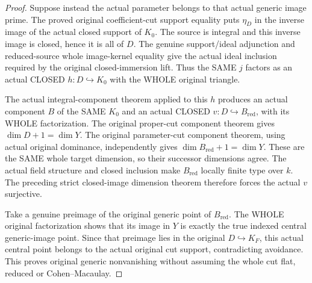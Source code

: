 \begin{proof}
Suppose instead the actual parameter belongs to that actual generic
image prime. The proved original coefficient-cut support equality puts
$\eta_D$ in the inverse image of the actual closed support of $K_0$.
The source is integral and this inverse image is closed, hence it is
all of $D$. The genuine support/ideal adjunction and reduced-source
whole image-kernel equality give the actual ideal inclusion required
by the original closed-immersion lift. Thus the SAME $j$ factors as an
actual CLOSED $h:D\hookrightarrow K_0$ with the WHOLE original triangle.

The actual integral-component theorem applied to this $h$ produces an
actual component $B$ of the SAME $K_0$ and an actual CLOSED
$v:D\hookrightarrow B_{\mathrm{red}}$, with its WHOLE factorization.
The original proper-cut component theorem gives
$\dim D+1=\dim Y$. The original parameter-cut component theorem,
using actual original dominance, independently gives
$\dim B_{\mathrm{red}}+1=\dim Y$. These are the SAME whole target
dimension, so their successor dimensions agree. The actual field
structure and closed inclusion make $B_{\mathrm{red}}$ locally finite
type over $k$. The preceding strict closed-image dimension theorem
therefore forces the actual $v$ surjective.

Take a genuine preimage of the original generic point of
$B_{\mathrm{red}}$. The WHOLE original factorization shows that its
image in $Y$ is exactly the true indexed central generic-image point.
Since that preimage lies in the original $D\hookrightarrow K_F$, this
actual central point belongs to the actual original cut support,
contradicting avoidance. This proves original generic nonvanishing
without assuming the whole cut flat, reduced or Cohen--Macaulay.
\end{proof}

